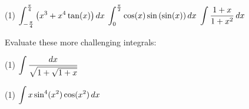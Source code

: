 \documentclass[mathNotesPreamble]{subfiles}
\begin{document}
  \begin{tasks}[after-item-skip=\stretch{1}, resume](1)
    \task $\displaystyle\int_{-\frac{\pi}{4}}^{\frac{\pi}{4}} {\left(x^3+x^4\tan(x)\right)}\,dx$
    \task $\displaystyle\int_{0}^{\frac{\pi}{2}} \cos(x)\sin{\left(\sin(x)\right)}\,dx$
    \task $\displaystyle\int \frac{1+x}{1+x^2}\,dx$
  \end{tasks}
  \pagebreak

  \noindent
  \begin{ex*}
    Evaluate these more challenging integrals:
  \end{ex*}
  \begin{tasks}[after-item-skip=\stretch{1}](1)
    \task $\displaystyle\int \frac{dx}{\sqrt{1+\sqrt{1+x}}}$
  \end{tasks}
  \pagebreak  
  
  \begin{tasks}[after-item-skip=\stretch{1}, resume](1)
    \task $\displaystyle\int x\sin^4(x^2)\cos(x^2)\,dx$
  \end{tasks}
  \pagebreak  
\end{document}
